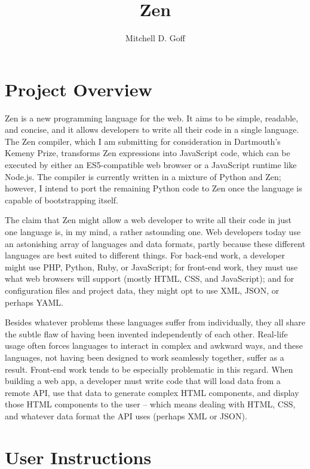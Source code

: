 \documentclass{article}
\title{Zen}
\author{Mitchell D. Goff}
\begin{document}
\maketitle
{}
\newpage
{}



\section{Project Overview}
Zen is a new programming language for the web. It aims to be simple, readable, and concise, and it allows developers to write all their code in a single language. The Zen compiler, which I am submitting for consideration in Dartmouth's Kemeny Prize, transforms Zen expressions into JavaScript code, which can be executed by either an ES5-compatible web browser or a JavaScript runtime like Node.js. The compiler is currently written in a mixture of Python and Zen; however, I intend to port the remaining Python code to Zen once the language is capable of bootstrapping itself.

The claim that Zen might allow a web developer to write all their code in just one language is, in my mind, a rather astounding one. Web developers today use an astonishing array of languages and data formats, partly because these different languages are best suited to different things. For back-end work, a developer might use PHP, Python, Ruby, or JavaScript; for front-end work, they must use what web browsers will support (mostly HTML, CSS, and JavaScript); and for configuration files and project data, they might opt to use XML, JSON, or perhaps YAML.

Besides whatever problems these languages suffer from individually, they all share the subtle flaw of having been invented independently of each other. Real-life usage often forces languages to interact in complex and awkward ways, and these languages, not having been designed to work seamlessly together, suffer as a result. Front-end work tends to be especially problematic in this regard. When building a web app, a developer must write code that will load data from a remote API, use that data to generate complex HTML components, and display those HTML components to the user -- which means dealing with HTML, CSS, and whatever data format the API uses (perhaps XML or JSON).





\section{User Instructions}
\end{document}
